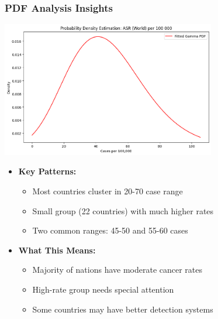 \begin{frame}
    \frametitle{PDF Analysis Insights}
    \centering
    \includegraphics[width=0.7\textwidth]{./images/graph/pdf.png}
    
    \begin{itemize}
        \item \textbf{Key Patterns:}
        \begin{itemize}
            \item Most countries cluster in 20-70 case range
            \item Small group (22 countries) with much higher rates
            \item Two common ranges: 45-50 and 55-60 cases
        \end{itemize}
        
        \item \textbf{What This Means:}
        \begin{itemize}
            \item Majority of nations have moderate cancer rates
            \item High-rate group needs special attention
            \item Some countries may have better detection systems
        \end{itemize}
    \end{itemize}
\end{frame}
